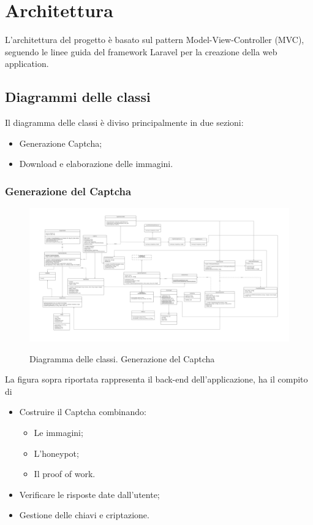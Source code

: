 \section{Architettura}
L'architettura del progetto è basato sul pattern Model-View-Controller (MVC), seguendo le linee guida del framework Laravel per la creazione della web application.


\subsection{Diagrammi delle classi}

Il diagramma delle classi è diviso principalmente in due sezioni:
\begin{itemize}
    \item Generazione Captcha;
    \item Download e elaborazione delle immagini.
\end{itemize}

\subsubsection{Generazione del Captcha}

\begin{figure}[H]
    \centering
    \includegraphics[scale = 1.0]{img/generale.png}\\
    \caption{Diagramma delle classi. Generazione del Captcha}
\end{figure}

La figura sopra riportata rappresenta il back-end dell'applicazione, ha il compito di
\begin{itemize}
    \item Costruire il Captcha combinando:
    \begin{itemize}
        \item Le immagini;
        \item L'honeypot;
        \item Il proof of work.
    \end{itemize}
    \item Verificare le risposte date dall'utente;
    \item Gestione delle chiavi e criptazione.
\end{itemize}

